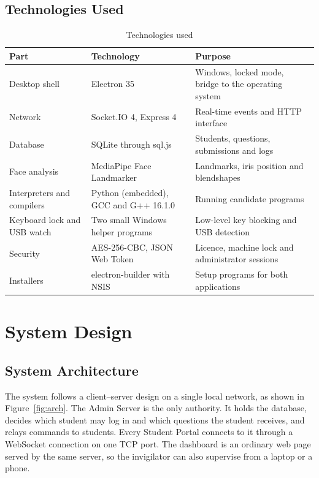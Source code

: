 \documentclass[12pt,a4paper]{report}
\begin{document}
\section{Technologies Used}
\begin{table}[H]
\centering
\caption{Technologies used}\label{tab:tech}
\footnotesize
\begin{tabularx}{\textwidth}{@{}L{3.6cm} L{3.4cm} Y@{}}
\toprule
\textbf{Part} & \textbf{Technology} & \textbf{Purpose}\\
\midrule
Desktop shell & Electron 35 & Windows, locked mode, bridge to the operating system\\
Network & Socket.IO 4, Express 4 & Real-time events and HTTP interface\\
Database & SQLite through sql.js & Students, questions, submissions and logs\\
Face analysis & MediaPipe Face Landmarker & Landmarks, iris position and blendshapes\\
Interpreters and compilers & Python (embedded), GCC and G++ 16.1.0 & Running candidate programs\\
Keyboard lock and USB watch & Two small Windows helper programs & Low-level key blocking and USB detection\\
Security & AES-256-CBC, JSON Web Token & Licence, machine lock and administrator sessions\\
Installers & electron-builder with NSIS & Setup programs for both applications\\
\bottomrule
\end{tabularx}
\end{table}

\chapter{System Design}

\section{System Architecture}
The system follows a client--server design on a single local network, as shown in Figure~\ref{fig:arch}. The Admin Server is the only authority. It holds the database, decides which student may log in and which questions the student receives, and relays commands to students. Every Student Portal connects to it through a WebSocket connection on one TCP port. The dashboard is an ordinary web page served by the same server, so the invigilator can also supervise from a laptop or a phone.
\end{document}
